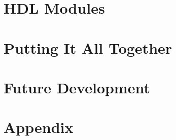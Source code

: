 \documentclass[12pt]{article}
\begin{document}
\section{HDL Modules}

\section{Putting It All Together}

\section{Future Development}

\section{Appendix}
\end{document}
